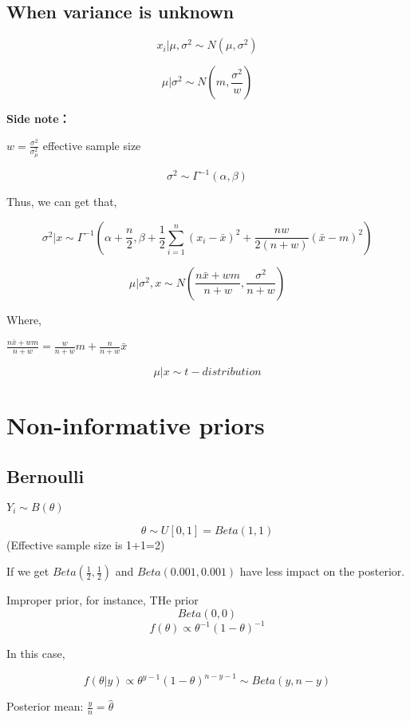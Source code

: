 \documentclass[
]{book}
\begin{document}
\hypertarget{when-variance-is-unknown}{%
\subsection{When variance is unknown}\label{when-variance-is-unknown}}

\[x_i | \mu, \sigma^2 \sim N (\mu, \sigma^2)\]

\[\mu | \sigma^2 \sim N(m, \frac{\sigma^2}{w})\]

\textbf{Side note：}

\(w=\frac{\sigma^2}{\sigma_{\mu}^2}\) effective sample size

\[\sigma^2 \sim \Gamma^{-1}(\alpha, \beta)\]

Thus, we can get that,

\[\sigma^2 | x\sim \Gamma^{-1}(\alpha+\frac{n}{2}, \beta+\frac{1}{2} \sum_{i=1}^{n}(x_i-\bar{x})^2+\frac{nw}{2(n+w)}(\bar{x}-m)^2)\]

\[\mu| \sigma^2,x \sim N(\frac{n \bar{x}+wm}{n+w},\frac{\sigma^2}{n+w})\]

Where,

\(\frac{n \bar{x}+wm}{n+w} = \frac{w}{n+w}m+\frac{n}{n+w}\bar{x}\)

\[\mu |x \sim t - distribution \]

\hypertarget{non-informative-priors}{%
\section{Non-informative priors}\label{non-informative-priors}}

\hypertarget{bernoulli}{%
\subsection{Bernoulli}\label{bernoulli}}

\(Y_i \sim B(\theta)\)

\[\theta \sim U[0,1]= Beta (1,1)\]
(Effective sample size is 1+1=2)

If we get \(Beta(\frac{1}{2},\frac{1}{2})\) and \(Beta(0.001, 0.001)\) have less impact on the posterior.

Improper prior, for instance,
THe prior \[Beta (0,0)\]
\[f(\theta) \propto \theta ^{-1}(1-\theta)^{-1}\]

In this case,

\[f(\theta| y) \propto \theta^{y-1}(1-\theta)^{n-y-1} \sim Beta(y, n-y)\]

Posterior mean: \(\frac{y}{n}=\hat{\theta}\)
\end{document}
